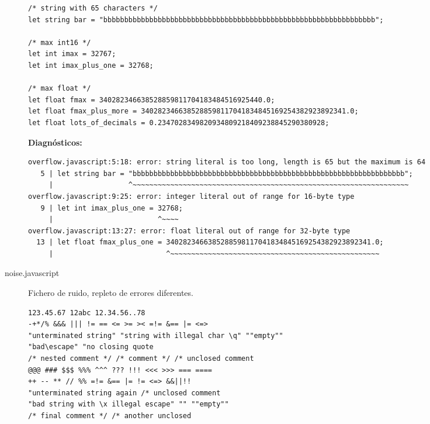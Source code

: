 \documentclass[a4paper]{CSMakotoTechnicalReport}
\begin{document}
\begin{appendices}
\begin{description}
\begin{lstlisting}
/* string with 65 characters */
let string bar = "bbbbbbbbbbbbbbbbbbbbbbbbbbbbbbbbbbbbbbbbbbbbbbbbbbbbbbbbbbbbbbbbb";

/* max int16 */
let int imax = 32767;
let int imax_plus_one = 32768;

/* max float */
let float fmax = 340282346638528859811704183484516925440.0;
let float fmax_plus_more = 3402823466385288598117041834845169254382923892341.0;
let float lots_of_decimals = 0.2347028349820934809218409238845290380928;
            \end{lstlisting}

            \textbf{Diagnósticos:}
            \begin{lstlisting}
overflow.javascript:5:18: error: string literal is too long, length is 65 but the maximum is 64
   5 | let string bar = "bbbbbbbbbbbbbbbbbbbbbbbbbbbbbbbbbbbbbbbbbbbbbbbbbbbbbbbbbbbbbbbbb";
     |                  ^~~~~~~~~~~~~~~~~~~~~~~~~~~~~~~~~~~~~~~~~~~~~~~~~~~~~~~~~~~~~~~~~~~
overflow.javascript:9:25: error: integer literal out of range for 16-byte type
   9 | let int imax_plus_one = 32768;
     |                         ^~~~~
overflow.javascript:13:27: error: float literal out of range for 32-byte type
  13 | let float fmax_plus_one = 3402823466385288598117041834845169254382923892341.0;
     |                           ^~~~~~~~~~~~~~~~~~~~~~~~~~~~~~~~~~~~~~~~~~~~~~~~~~~
            \end{lstlisting}
            \newpage

        \item[noise.javascript] Fichero de ruido, repleto de errores diferentes.
            \begin{lstlisting}
123.45.67 12abc 12.34.56..78
-+*/% &&& ||| != == <= >= >< =!= &== |= <=>
"unterminated string" "string with illegal char \q" ""empty""
"bad\escape" "no closing quote
/* nested comment */ /* comment */ /* unclosed comment
@@@ ### $$$ %%% ^^^ ??? !!! <<< >>> === ====
++ -- ** // %% =!= &== |= != <=> &&||!!
"unterminated string again /* unclosed comment
"bad string with \x illegal escape" "" ""empty""
/* final comment */ /* another unclosed
            \end{lstlisting}


\end{description}
\end{appendices}
\end{document}
